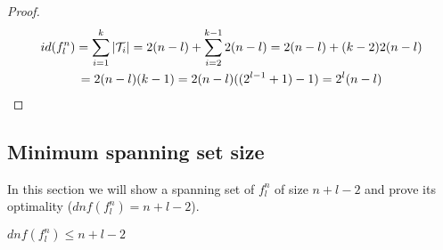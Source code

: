 \begin{proof}
\begin{multline*}
id(f_l^n) = \sum_{i=1}^k{\lvert\mathcal{T}_i\rvert}
= 2 (n-l) + \sum_{i=2}^{k-1}{2 (n-l)}
= 2 (n-l) + (k-2) 2 (n-l) \\
= 2 (n-l) (k-1)
= 2 (n-l) ((2^{l-1} + 1) - 1)
= 2^l (n-l)
\end{multline*}
\end{proof}

\subsection{Minimum spanning set size}

In this section we will show a spanning set
of $f^n_l$ of size $n+l-2$
and prove its optimality
($dnf(f^n_l) = n+l-2$).

\begin{lemma}
\label{lemma:difficultdnfupper}
$dnf(f_l^n) \leq n+l-2$
\end{lemma}

